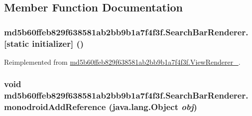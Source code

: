 \subsection{Member Function Documentation}
\hypertarget{classmd5b60ffeb829f638581ab2bb9b1a7f4f3f_1_1_search_bar_renderer_ea4b7a40383fa8ec0f5ea4d35a208d21}{
\subsubsection[{[static initializer]}]{\setlength{\rightskip}{0pt plus 5cm}md5b60ffeb829f638581ab2bb9b1a7f4f3f.SearchBarRenderer.\mbox{[}static initializer\mbox{]} ()}}
\label{classmd5b60ffeb829f638581ab2bb9b1a7f4f3f_1_1_search_bar_renderer_ea4b7a40383fa8ec0f5ea4d35a208d21}




Reimplemented from \hyperlink{classmd5b60ffeb829f638581ab2bb9b1a7f4f3f_1_1_view_renderer__2_a0898cf56fa9a49b653470eaf1608e77}{md5b60ffeb829f638581ab2bb9b1a7f4f3f.ViewRenderer\_}.\hypertarget{classmd5b60ffeb829f638581ab2bb9b1a7f4f3f_1_1_search_bar_renderer_9b7a0243add9b3f0e1e1e2e9883f69c6}{
\subsubsection[{monodroidAddReference}]{\setlength{\rightskip}{0pt plus 5cm}void md5b60ffeb829f638581ab2bb9b1a7f4f3f.SearchBarRenderer.monodroidAddReference (java.lang.Object {\em obj})}}
\label{classmd5b60ffeb829f638581ab2bb9b1a7f4f3f_1_1_search_bar_renderer_9b7a0243add9b3f0e1e1e2e9883f69c6}




